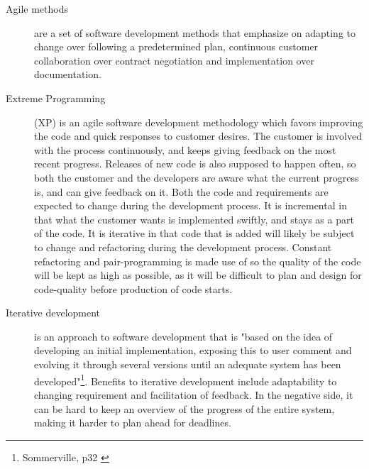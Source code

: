 \begin{description}

\item[Agile methods] \label{def:agile} are a set of software development methods that emphasize on adapting to change over following a predetermined plan, continuous customer collaboration over contract negotiation and implementation over documentation.

\item[Extreme Programming] (XP) is an agile software development methodology which favors improving the code and quick responses to customer desires. The customer is involved with the process continuously, and keeps giving feedback on the most recent progress. Releases of new code is also supposed to happen often, so both the customer and the developers are aware what the current progress is, and can give feedback on it. Both the code and requirements are expected to change during the development process. It is incremental in that what the customer wants is implemented swiftly, and stays as a part of the code. It is iterative in that code that is added will likely be subject to change and refactoring during the development process. Constant refactoring and pair-programming is made use of so the quality of the code will be kept as high as possible, as it will be difficult to plan and design for code-quality before production of code starts. 
\item[Iterative development] \label{def:incrementalDev} is an approach to software development that is "based on the idea of developing an initial implementation, exposing this to user comment and evolving it through several versions until an adequate system has been developed"\footnote{Sommerville, p32 \cite{sommerville}}. Benefits to iterative development include adaptability to changing requirement and facilitation of feedback. In the negative side, it can be hard to keep an overview of the progress of the entire system, making it harder to plan ahead for deadlines.


\end{description}
